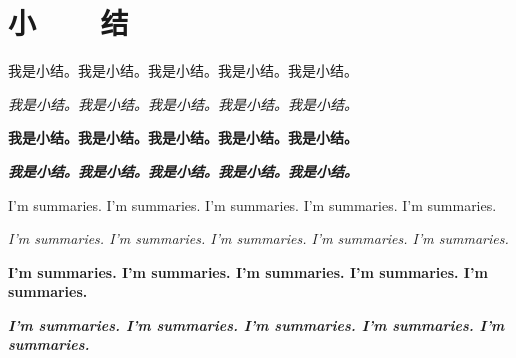 \chapter{小~~~~结}

我是小结。我是小结。我是小结。我是小结。我是小结。

\textit{我是小结。我是小结。我是小结。我是小结。我是小结。}

\textbf{我是小结。我是小结。我是小结。我是小结。我是小结。}

\textbf{\textit{我是小结。我是小结。我是小结。我是小结。我是小结。}}

I'm summaries. I'm summaries. I'm summaries. I'm summaries. I'm summaries.

\textit{I'm summaries. I'm summaries. I'm summaries. I'm summaries. I'm summaries.}

\textbf{I'm summaries. I'm summaries. I'm summaries. I'm summaries. I'm summaries.}

\textbf{\textit{I'm summaries. I'm summaries. I'm summaries. I'm summaries. I'm summaries.}}

\clearpage